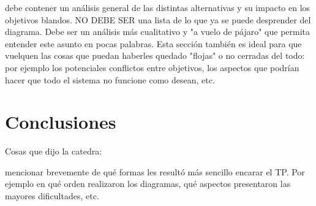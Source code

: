 \documentclass[a4paper,10pt]{article}
\begin{document}
debe contener un análisis general de las distintas
alternativas y su impacto en los objetivos blandos. NO DEBE SER una
lista de lo que ya se puede desprender del diagrama. Debe ser un
análisis más cualitativo y "a vuelo de pájaro" que permita entender
este asunto en pocas palabras. Esta sección también es ideal para que
vuelquen las cosas que puedan haberles quedado "flojas" o no cerradas
del todo: por ejemplo los potenciales conflictos entre objetivos, los
aspectos que podrían hacer que todo el sistema no funcione como
desean, etc.


\section*{Conclusiones}

Cosas que dijo la catedra:

mencionar brevemente de qué formas les resultó más
sencillo encarar el TP. Por ejemplo en qué orden realizaron los
diagramas, qué aspectos presentaron las mayores dificultades, etc.
\end{document}
